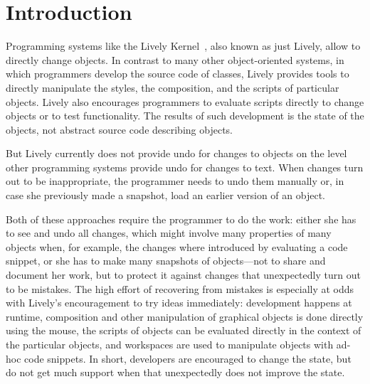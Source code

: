 
\chapter{Introduction} \label{chapter:INTRODUCTION}

Programming systems like the Lively Kernel~\cite{Ingalls2008LKS,Krahn2009LWD}, also known as just Lively, allow to directly change objects.
In contrast to many other object-oriented systems, in which programmers develop the source code of classes, Lively provides tools to directly manipulate the styles, the composition, and the scripts of particular objects.
Lively also encourages programmers to evaluate scripts directly to change objects or to test functionality.
The results of such development is the state of the objects, not abstract source code describing objects.

But Lively currently does not provide undo for changes to objects on the level other programming systems provide undo for changes to text.
When changes turn out to be inappropriate, the programmer needs to undo them manually or, in case she previously made a snapshot, load an earlier version of an object.

Both of these approaches require the programmer to do the work: either she has to see and undo all changes, which might involve many properties of many objects when, for example, the changes where introduced by evaluating a code snippet, or she has to make many snapshots of objects---not to share and document her work, but to protect it against changes that unexpectedly turn out to be mistakes.
The high effort of recovering from mistakes is especially at odds with Lively's encouragement to try ideas immediately: development happens at runtime, composition and other manipulation of graphical objects is done directly using the mouse, the scripts of objects can be evaluated directly in the context of the particular objects, and workspaces are used to manipulate objects with ad-hoc code snippets.
In short, developers are encouraged to change the state, but do not get much support when that unexpectedly does not improve the state.

